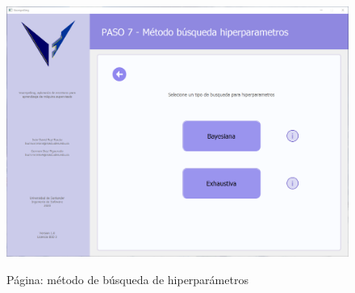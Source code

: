\begin{figure}[H]
    \centering
    \caption{Página: método de búsqueda de hiperparámetros}
    \includegraphics[width=\textwidth]{images/hiperparametersearchmethod.png}
    \label{fig:hiperparamsearchmethod}
\end{figure}


